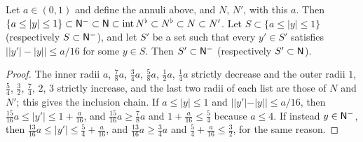 \begin{lemma}
\label{lem:annuli}
Let $a\in(0,1)$ and define the annuli above, and $N$, $N'$, with this $a$. Then
$\{a\le|y|\le1\}\subset\mathsf{N}^{-}\subset\mathsf{N}\subset\operatorname{int}N^{\flat}\subset N^{\flat}\subset N\subset N'$.
Let $S\subset\{a\le|y|\le1\}$ \textup{(}respectively $S\subset\mathsf{N}^{-}$\textup{)},
and let $S'$ be a set such that every $y'\in S'$ satisfies
$\big||y'|-|y|\big|\le a/16$ for some $y\in S$. Then $S'\subset\mathsf{N}^{-}$
\textup{(}respectively $S'\subset\mathsf{N}$\textup{)}.
\end{lemma}
\begin{proof}
The inner radii $a$, $\frac78a$, $\frac34a$, $\frac58a$, $\frac12a$, $\frac14a$
strictly decrease and the outer radii $1$, $\frac54$, $\frac32$, $\frac74$, $2$, $3$
strictly increase, and the last two radii of each list are those of $N$ and $N'$;
this gives the inclusion chain. If $a\le|y|\le1$ and
$||y'|-|y||\le a/16$, then $\frac{15}{16}a\le|y'|\le1+\frac a{16}$, and
$\frac{15}{16}a\ge\frac78a$ and $1+\frac a{16}\le\frac54$ because $a\le4$. If
instead $y\in\mathsf{N}^{-}$, then $\frac{13}{16}a\le|y'|\le\frac54+\frac a{16}$, and
$\frac{13}{16}a\ge\frac34a$ and $\frac54+\frac a{16}\le\frac32$, for the same
reason.
\end{proof}

